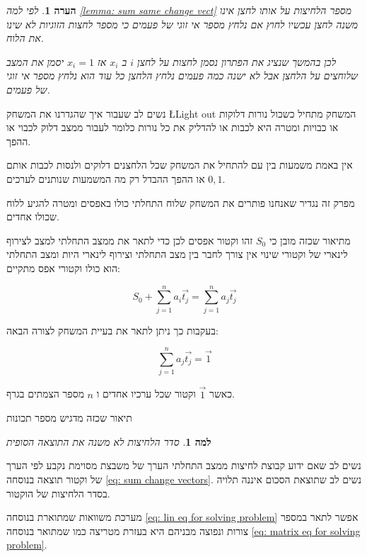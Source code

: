 \documentclass[12pt,twoside]{article}
\newtheorem{lemma}{למה}[section]
\newtheorem{comm}{הערה}[section]
\newcommand{\sumi}[1]{\sum_{#1=1}^n}
\begin{document}
\begin{comm}
    \label{comm: press is uneven presses}
    לפי למה
    \ref{lemma:  sum same change vect}
    מספר הלחיצות על אותו לחצן אינו משנה 
    לחצן עכשיו 
    לחוץ אם נלחץ מספר אי זוגי של פעמים 
    כי מספר לחצות הזוגיות לא שינו את הלוח.

    לכן בהמשך שנציג את הפתרון נסמן לחצות על לחצן 
    $i$
    ב
    $x_i$
    אז 
    $x_i = 1$
    יסמן את המצב שלוחצים על הלחצן אבל לא ישנה כמה פעמים נלחץ הלחצן 
    כל עוד הוא נלחץ מספר אי זוגי של פעמים.
\end{comm}

נשים לב שעבור איך שהגדרנו את המשחק 
\L{Light out}
המשחק מתחיל כשכול
נורות דלוקות או כבויות
ומטרה היא לכבות או להדליק את כל נורות
כלומר לעבור ממצב דלוק לכבוי או ההפך.

אין באמת משמעות בין עם להתחיל את המשחק שכל הלחצנים דלוקים ולנסות לכבות אותם או ההפך ההבדל רק
מה המשמעות שנותנים לערכים
$0 ,1 $.

מפרק זה נגדיר שאנחנו פותרים את המשחק שלוח התחלתי כולו באפסים
ומטרה להגיע ללוח שכולו אחדים.

מתיאור שכזה מובן כי 
$S_0$
זהו וקטור אפסים לכן כדי לתאר את ממצב התחלתי
למצב לצירוף לינארי של וקטורי שינוי 
אין צורך לחבר בין מצב התחלתי וצירוף לינארי
היות ומצב התחלתי הוא כולו וקטורי אפס
מתקיים:

\begin{equation}
    \label{eq: sum change vectors}
    S_0 + \sumi{j} a_i \vec{t_j} =  \sumi{j} a_j \vec{t_j}
\end{equation}

בעקבות כך ניתן לתאר את בעיית המשחק לצורה הבאה:

\begin{equation}
    \label{eq: lin eq for solving problem}
    \sumi{j} a_j \vec{t_j} = \vec{1}
\end{equation}

כאשר
$\vec{1}$
וקטור שכל ערכיו אחדים
ו
$n$
מספר הצמתים בגרף.

תיאור שכזה מדגיש מספר תכונות 

\begin{lemma}
    סדר הלחיצות לא משנה את התוצאה הסופית
\end{lemma}
נשים לב שאם ידוע קבוצת לחיצות ממצב התחלתי הערך של משבצת מסוימת נקבע לפי 
הערך של וקטור תוצאה
בנוסחה
\ref{eq: sum change vectors}.
נשים לב שתוצאת הסכום איננה תלויה בסדר הלחיצות של הוקטור. 

מערכת משוואות 
שמתוארת בנוסחה
\ref{eq: lin eq for solving problem}
אפשר לתאר במספר צורות ונפוצה מבניהם היא
בעזרת מטריצה כמו שמתואר 
בנוסחה 
\ref{eq: matrix eq for solving problem}.
\end{document}

